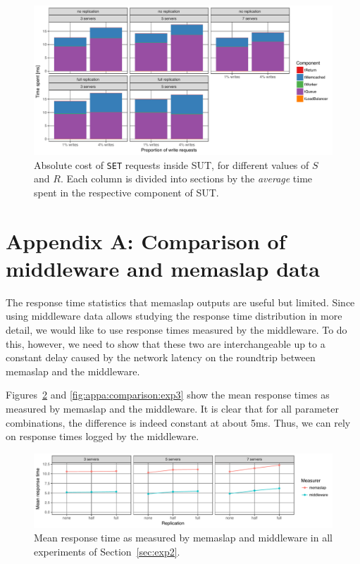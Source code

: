 \documentclass[11pt]{article}
\newcommand{\set}[0]{\texttt{SET}}
\begin{document}
\begin{figure}[h]
\centering
\includegraphics[width=\textwidth]{../results/writes/graphs/time_breakdown_vs_writes_set_abs.pdf}
\caption{Absolute cost of \set{} requests inside SUT, for different values of $S$ and $R$. Each column is divided into sections by the \emph{average} time spent in the respective component of SUT.}
\label{fig:exp3:res:breakdown:set:abs}
\end{figure}

\clearpage

\section*{Appendix A: Comparison of middleware and memaslap data}
\label{sec:appa}

The response time statistics that memaslap outputs are useful but limited. Since using middleware data allows studying the response time distribution in more detail, we would like to use response times measured by the middleware. To do this, however, we need to show that these two are interchangeable up to a constant delay caused by the network latency on the roundtrip between memaslap and the middleware.

Figures~\ref{fig:appa:comparison:exp2} and \ref{fig:appa:comparison:exp3} show the mean response times as measured by memaslap and the middleware. It is clear that for all parameter combinations, the difference is indeed constant at about 5ms. Thus, we can rely on response times logged by the middleware.

\begin{figure}[h]
\centering
\includegraphics[width=\textwidth]{../results/replication/graphs/compare_mw_ms.pdf}
\caption{Mean response time as measured by memaslap and middleware in all experiments of Section~\ref{sec:exp2}.}
\label{fig:appa:comparison:exp2}
\end{figure}
\end{document}
